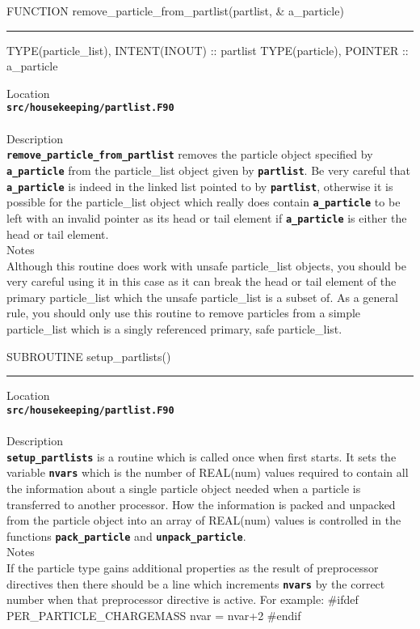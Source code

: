 \documentclass[12pt,a4paper]{article}
\newcommand{\HRule}{\rule[0.3cm]{\linewidth}{0.5mm}}
\newcommand{\inlinecode}[1]{{\color{warwickred} \bf\texttt{#1}}}
\newcommand{\EPOCH}{{\color{warwickdark}\fontfamily{phv}\selectfont{EPOCH}}}
\newenvironment{boxverbatim}{\lboxverbatim{none}}{\endlboxverbatim}
\begin{document}
\pagebreak
\begin{codedef}
FUNCTION remove_particle_from_partlist(partlist, &
    a_particle)
\HRule
TYPE(particle_list), INTENT(INOUT) :: partlist
TYPE(particle), POINTER :: a_particle
\end{codedef}
\vspace{1cm}
{\Large Location\\}
\inlinecode{src/housekeeping/partlist.F90}\\
\\[0.5cm]
{\Large Description\\}
\inlinecode{remove\_particle\_from\_partlist} removes the particle object
specified by \inlinecode{a\_particle} from the particle\_list object given by
\inlinecode{partlist}. Be very careful that \inlinecode{a\_particle} is indeed
in the linked list pointed to by \inlinecode{partlist}, otherwise it is possible
for the particle\_list object which really does contain \inlinecode{a\_particle}
to be left with an invalid pointer as its head or tail element if
\inlinecode{a\_particle} is either the head or tail element.
\\[0.5cm]
{\Large Notes\\}
Although this routine does work with unsafe particle\_list objects, you should
be very careful using it in this case as it can break the head or tail element
of the primary particle\_list which the unsafe particle\_list is a subset of.
As a general rule, you should only use this routine to remove particles from a
simple particle\_list which is a singly referenced primary, safe particle\_list.

\pagebreak
\begin{codedef}
SUBROUTINE setup_partlists()
\HRule

\end{codedef}
\vspace{1cm}
{\Large Location\\}
\inlinecode{src/housekeeping/partlist.F90}\\
\\[0.5cm]
{\Large Description\\}
\inlinecode{setup\_partlists} is a routine which is called once when {\EPOCH}
first starts. It sets the variable \inlinecode{nvars} which is the number of
REAL(num) values required to contain all the information about a
single particle object needed when a particle is transferred to another
processor. How the information is packed and unpacked from the particle object
into an array of REAL(num) values is controlled in the functions
\inlinecode{pack\_particle} and \inlinecode{unpack\_particle}.
\\[0.5cm]
{\Large Notes\\}
If the particle type gains additional properties as the result of preprocessor
directives then there should be a line which increments \inlinecode{nvars} by
the correct number when that preprocessor directive is active. For example:
\begin{boxverbatim}
#ifdef PER_PARTICLE_CHARGEMASS
  nvar = nvar+2
#endif
\end{boxverbatim}
\end{document}
